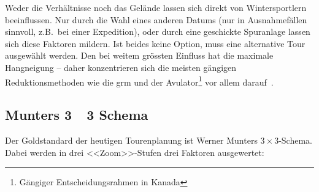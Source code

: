 Weder die Verhältnisse noch das Gelände lassen sich direkt von Wintersportlern beeinflussen. Nur durch die Wahl eines anderen Datums (nur in Ausnahmefällen sinnvoll, z.B.\ bei einer Expedition), oder durch eine geschickte Spuranlage lassen sich diese Faktoren mildern. 
Ist beides keine Option, muss eine alternative Tour ausgewählt werden.
Den bei weitem grössten Einfluss hat die maximale Hangneigung -- daher konzentrieren sich die meisten gängigen Reduktionsmethoden wie die \gls{grm} und der Avulator\footnote{Gängiger Entscheidungsrahmen in Kanada} vor allem darauf~\cite{arpddatasetdocs}\cite{harveyrhynerschweizerlawinenkunde}.

\subsection{Munters 3~\texttimes~3 Schema}
Der Goldstandard der heutigen Tourenplanung ist Werner Munters $3\times3$-Schema. Dabei werden in drei <<Zoom>>-Stufen drei Faktoren ausgewertet:


